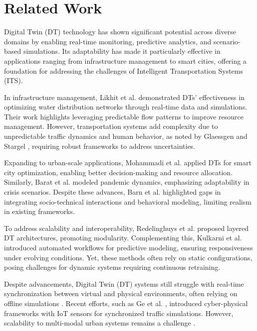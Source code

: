 \section{Related Work}
Digital Twin (DT) technology has shown significant potential across diverse domains by enabling real-time monitoring, predictive analytics, and scenario-based simulations. Its adaptability has made it particularly effective in applications ranging from infrastructure management to smart cities, offering a foundation for addressing the challenges of Intelligent Transportation Systems (ITS).

In infrastructure management, Likhit et al. \cite{kanigolla2024architecting} demonstrated DTs' effectiveness in optimizing water distribution networks through real-time data and simulations. Their work highlights leveraging predictable flow patterns to improve resource management. However, transportation systems add complexity due to unpredictable traffic dynamics and human behavior, as noted by Glaessgen and Stargel \cite{glaessgen2012digital}, requiring robust frameworks to address uncertainties.

Expanding to urban-scale applications, Mohammadi et al. \cite{MohammadiSmartCity} applied DTs for smart city optimization, enabling better decision-making and resource allocation. Similarly, Barat et al. \cite{barat2022agent} modeled pandemic dynamics, emphasizing adaptability in crisis scenarios. Despite these advances, Barn et al. \cite{balbir} highlighted gaps in integrating socio-technical interactions and behavioral modeling, limiting realism in existing frameworks.

To address scalability and interoperability, Redelinghuys et al. \cite{redelinghuys2020six} proposed layered DT architectures, promoting modularity. Complementing this, Kulkarni et al. \cite{kulkarni2023dtworkflow} introduced automated workflows for predictive modeling, ensuring responsiveness under evolving conditions. Yet, these methods often rely on static configurations, posing challenges for dynamic systems requiring continuous retraining.

Despite advancements, Digital Twin (DT) systems still struggle with real-time synchronization between virtual and physical environments, often relying on offline simulations \cite{baolixia}. Recent efforts, such as Ge et al. \cite{kuvsic2023digital}, introduced cyber-physical frameworks with IoT sensors for synchronized traffic simulations. However, scalability to multi-modal urban systems remains a challenge \cite{lee2015cyber}.

